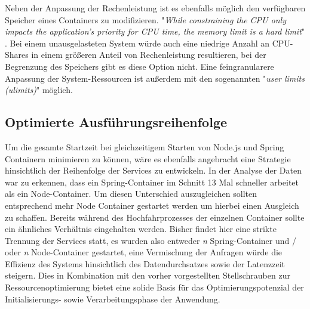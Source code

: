 Neben der Anpassung der Rechenleistung ist es ebenfalls möglich den verfügbaren Speicher eines Containers zu modifizieren. "\emph{While constraining the CPU only impacts the application’s priority for CPU time, the memory limit is a hard limit}" \cite[Seite~68 ff.]{oreilly-docker}. Bei einem unausgelasteten System würde auch eine niedrige Anzahl an CPU-Shares in einem größeren Anteil von Rechenleistung resultieren, bei der Begrenzung des Speichers gibt es diese Option nicht. Eine feingranularere Anpassung der System-Ressourcen ist außerdem mit den sogenannten "\emph{user limits (ulimits)}" möglich.

\subsection{Optimierte Ausführungsreihenfolge}
Um die gesamte Startzeit bei gleichzeitigem Starten von Node.js und Spring Containern minimieren zu können, wäre es ebenfalls angebracht eine Strategie hinsichtlich der Reihenfolge der Services zu entwickeln. In der Analyse der Daten war zu erkennen, dass ein Spring-Container im Schnitt 13 Mal schneller arbeitet als ein Node-Container. Um diesen Unterschied auszugleichen sollten entsprechend mehr Node Container gestartet werden um hierbei einen Ausgleich zu schaffen. Bereits während des Hochfahrprozesses der einzelnen Container sollte ein ähnliches Verhältnis eingehalten werden. Bisher findet hier eine strikte Trennung der Services statt, es wurden also entweder \emph{n} Spring-Container und / oder \emph{n} Node-Container gestartet, eine Vermischung der Anfragen würde die Effizienz des Systems hinsichtlich des Datendurchsatzes sowie der Latenzzeit steigern. Dies in Kombination mit den vorher vorgestellten Stellschrauben zur Ressourcenoptimierung bietet eine solide Basis für das Optimierungspotenzial der Initialisierungs- sowie Verarbeitungsphase der Anwendung.


